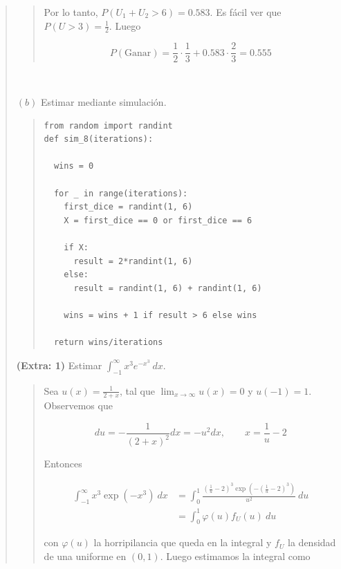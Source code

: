 \documentclass[a4paper, 12pt]{article}
\begin{document}
\begin{quote}
\begin{quote}
Por lo tanto, $P(U_1 + U_2 > 6) = 0.583$. Es fácil ver que $P(U > 3) =
\frac{1}{2}$. Luego 

\begin{equation*}
  P(\text{Ganar}) = \frac{1}{2} \cdot \frac{1}{3} + 0.583 \cdot \frac{2}{3} =
  0.555
\end{equation*}

\end{quote}
\normalsize


~ 

$(b)$ Estimar mediante simulación.


\footnotesize
\begin{quote}

\begin{verbatim}
from random import randint
def sim_8(iterations):

  wins = 0

  for _ in range(iterations):
    first_dice = randint(1, 6)
    X = first_dice == 0 or first_dice == 6
  
    if X:
      result = 2*randint(1, 6)
    else:
      result = randint(1, 6) + randint(1, 6)

    wins = wins + 1 if result > 6 else wins

  return wins/iterations
\end{verbatim}

\end{quote}
\normalsize

\pagebreak 

\textbf{(Extra: 1)} Estimar $\int_{-1}^\infty x^3e^{-x^3} ~ dx$.


\small
\begin{quote}

Sea $u(x) = \frac{1}{2 + x}$, tal que $\lim_{x \to \infty} u(x) = 0$ y $u(-1) =1$.
Observemos que 

\begin{equation*}
  du = -\frac{1}{(2+x)^2} dx = -u^2 dx, \qquad x = \frac{1}{u} - 2
\end{equation*}

Entonces 

\begin{align*}
  \int_{-1}^\infty x^3 \exp\left( -x^3 \right) ~ dx
  &= \int_0^1 
 \frac{\left( \frac{1}{u} -2 \right)^3 \exp\left( -\left(
   \frac{1}{u}-2\right)^3\right)}{u^2}  ~ du \\ 
  &= \int_0^1 \varphi(u) f_U(u) ~ du
\end{align*}

con $\varphi(u)$ la horripilancia que queda en la integral y $f_U$ la densidad
de una uniforme en $(0, 1)$. Luego estimamos la integral como 


\end{quote}
\end{quote}
\end{document}
